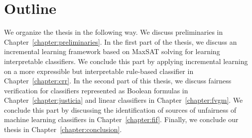 \section{Outline}
We organize the thesis in the following way. We discuss preliminaries in Chapter~\ref{chapter:preliminaries}. In the first part of the thesis, we discuss an incremental learning framework based on MaxSAT solving for learning interpretable classifiers. We conclude this part by applying incremental learning on a more expressible but interpretable rule-based classifier in Chapter~\ref{chapter:crr}. In the second part of this thesis, we discuss  fairness verification for classifiers represented as Boolean formulas in Chapter~\ref{chapter:justicia} and linear classifiers in Chapter~\ref{chapter:fvgm}. We conclude this part by discussing the identification of sources of unfairness of machine learning classifiers in Chapter~\ref{chapter:fif}. Finally, we conclude our thesis in Chapter~\ref{chapter:conclusion}.


